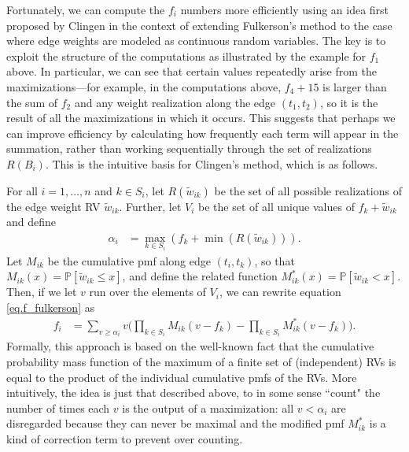 \documentclass[12pt]{article}
\def\P{\mathbb{P}}
\begin{document}
Fortunately, we can compute the $f_i$ numbers more efficiently using an idea first proposed by Clingen \cite{cling64} in the context of extending Fulkerson's method to the case where edge weights are modeled as continuous random variables. The key is to exploit the structure of the computations as illustrated by the example for $f_1$ above. In particular, we can see that certain values repeatedly arise from the maximizations---for example, in the computations above, $f_4 + 15$ is larger than the sum of $f_2$ and any weight realization along the edge $(t_1, t_2)$, so it is the result of all the maximizations in which it occurs. This suggests that perhaps we can improve efficiency by calculating how frequently each term will appear in the summation, rather than working sequentially through the set of realizations $R(B_i)$. This is the intuitive basis for Clingen's method, which is as follows. 

For all $i = 1, \dots, n$ and $k \in S_i$, let $R(\tilde{w}_{ik})$ be the set of all possible realizations of the edge weight RV $\tilde{w}_{ik}$. Further, let $V_i$ be the set of all unique values of $f_k + \tilde{w}_{ik}$ 
and define 
\begin{align*}
\alpha_i &= \max_{k \in S_i}(f_k + \min(R(\tilde{w}_{ik}))).
\end{align*}
Let $M_{ik}$ be the cumulative pmf along edge $(t_i, t_k)$, so that $M_{ik}(x) = \P[\tilde{w}_{ik} \leq x]$, and define the related function $M_{ik}^{*}(x) = \P[\tilde{w}_{ik} < x]$.
Then, if we let $v$ run over the elements of $V_i$, we can rewrite equation \eqref{eq.f_fulkerson} as 
\begin{align}
f_i &= \sum_{v \geq \alpha_i} v \bigg( \prod_{k \in S_i} M_{ik}(v - f_k) - \prod_{k \in S_i} M_{ik}^{*}(v - f_k) \bigg). \label{eq.f_clingen}
\end{align}
Formally, this approach is based on the well-known fact that the cumulative probability mass function of the maximum of a finite set of (independent) RVs is equal to the product of the individual cumulative pmfs of the RVs. More intuitively, the idea is just that described above, to in some sense ``count" the number of times each $v$ is the output of a maximization: all $v < \alpha_i$ are disregarded because they can never be maximal and the modified pmf $M_{ik}^*$ is a kind of correction term to prevent over counting.        
\end{document}
